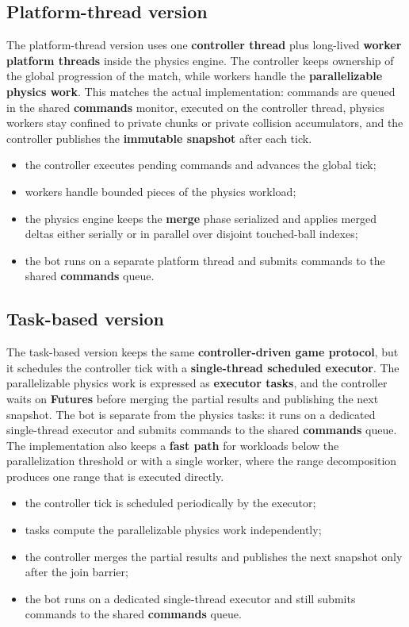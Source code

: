 \subsection{Platform-thread version}

The platform-thread version uses one \textbf{controller thread} plus long-lived \textbf{worker platform threads} inside the physics engine. The controller keeps ownership of the global progression of the match, while workers handle the \textbf{parallelizable physics work}. This matches the actual implementation: commands are queued in the shared \textbf{commands} monitor, executed on the controller thread, physics workers stay confined to private chunks or private collision accumulators, and the controller publishes the \textbf{immutable snapshot} after each tick.

\begin{itemize}
    \item the controller executes pending commands and advances the global tick;
    \item workers handle bounded pieces of the physics workload;
    \item the physics engine keeps the \textbf{merge} phase serialized and applies merged deltas either serially or in parallel over disjoint touched-ball indexes;
    \item the bot runs on a separate platform thread and submits commands to the shared \textbf{commands} queue.
\end{itemize}

\subsection{Task-based version}

The task-based version keeps the same \textbf{controller-driven game protocol}, but it schedules the controller tick with a \textbf{single-thread scheduled executor}. The parallelizable physics work is expressed as \textbf{executor tasks}, and the controller waits on \textbf{Futures} before merging the partial results and publishing the next snapshot. The bot is separate from the physics tasks: it runs on a dedicated single-thread executor and submits commands to the shared \textbf{commands} queue. The implementation also keeps a \textbf{fast path} for workloads below the parallelization threshold or with a single worker, where the range decomposition produces one range that is executed directly.

\begin{itemize}
    \item the controller tick is scheduled periodically by the executor;
    \item tasks compute the parallelizable physics work independently;
    \item the controller merges the partial results and publishes the next snapshot only after the join barrier;
    \item the bot runs on a dedicated single-thread executor and still submits commands to the shared \textbf{commands} queue.
\end{itemize}

